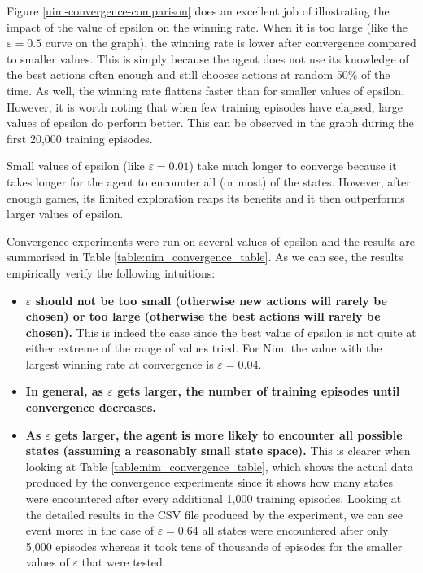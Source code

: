 \documentclass[11pt,a4paper]{report}
\begin{document}
Figure \ref{nim-convergence-comparison} does an excellent job of illustrating the impact of the value of epsilon on the winning rate. When it is too large (like the $\varepsilon = 0.5$ curve on the graph), the winning rate is lower after convergence compared to smaller values. This is simply because the agent does not use its knowledge of the best actions often enough and still chooses actions at random 50\% of the time. As well, the winning rate flattens faster than for smaller values of epsilon. However, it is worth noting that when few training episodes have elapsed, large values of epsilon do perform better. This can be observed in the graph during the first 20,000 training episodes.

Small values of epsilon (like $\varepsilon = 0.01$) take much longer to converge because it takes longer for the agent to encounter all (or most) of the states. However, after enough games, its limited exploration reaps its benefits and it then outperforms larger values of epsilon.



Convergence experiments were run on several values of epsilon and the results are summarised in Table \ref{table:nim_convergence_table}. As we can see, the results empirically verify the following intuitions:

\begin{itemize}

	\item \textbf{$\varepsilon$ should not be too small (otherwise new actions will rarely be chosen) or too large (otherwise the best actions will rarely be chosen).} This is indeed the case since the best value of epsilon is not quite at either extreme of the range of values tried. For Nim, the value with the largest winning rate at convergence is $\varepsilon = 0.04$.

	\item \textbf{In general, as $\varepsilon$ gets larger, the number of training episodes until convergence decreases.}

	\item \textbf{As $\varepsilon$ gets larger, the agent is more likely to encounter all possible states (assuming a reasonably small state space).} This is clearer when looking at Table \ref{table:nim_convergence_table}, which shows the actual data produced by the convergence experiments since it shows how many states were encountered after every additional 1,000 training episodes. Looking at the detailed results in the CSV file produced by the experiment, we can see event more: in the case of $\varepsilon = 0.64$ all states were encountered after only 5,000 episodes whereas it took tens of thousands of episodes for the smaller values of $\varepsilon$ that were tested.

\end{itemize}
\end{document}
